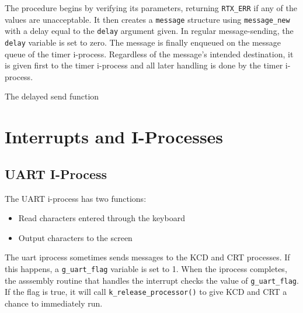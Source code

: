 \documentclass[12pt]{report}
\begin{document}
The procedure begins by verifying its parameters, returning {\tt RTX_ERR} if any of the values are unacceptable. It then creates a {\tt message} structure using {\tt message\_new} with a delay equal to the {\tt delay} argument given. In regular message-sending, the {\tt delay} variable is set to zero. The message is finally enqueued on the message queue of the timer i-process. Regardless of the message's intended destination, it is given first to the timer i-process and all later handling is done by the timer i-process.\\

\begin{algorithm}
  \caption{The delayed send function}
  \begin{algorithmic}[1]
		\EndIf
		\EndIf
    \EndProcedure
  \end{algorithmic}
\end{algorithm}


\section{Interrupts and I-Processes}

\subsection{UART I-Process}

The UART i-process has two functions:

\begin{itemize}
\item Read characters entered through the keyboard
\item Output characters to the screen
\end{itemize}

The uart iprocess sometimes sends messages to the KCD and CRT processes. If this happens, a {\tt g\_uart\_flag} variable is set to 1. When the iprocess completes, the asssembly routine that handles the interrupt checks the value of {\tt g\_uart\_flag}. If the flag is true, it will call {\tt k\_release\_processor()} to give KCD and CRT a chance to immediately run.\\
\end{document}
